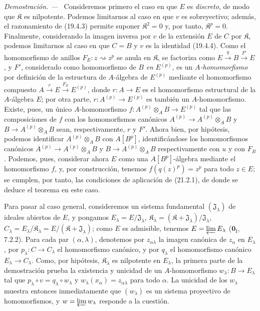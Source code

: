 \documentclass[10pt,oneside]{book}
\newcommand{\oldpage}[2][]{%
  \setcounter{footnote}{0}%
  \marginpar{\scriptsize\textbf{#1}~|~#2}\ignorespaces}
\newenvironment{proof}{%
  \par\medskip\noindent\textit{Demostración. ---\ }}{\par}
\begin{document}
\begin{proof}
Consideremos primero el caso en que $E$ es \emph{discreto}, de modo que $\mathfrak K$
es nilpotente. Podemos limitarnos al caso en que $v$ es sobreyectivo; además,
el razonamiento de (19.4.3) permite suponer $\mathfrak K^2=0$ y, por tanto,
$\mathfrak K^p=0$. Finalmente, considerando la imagen inversa por $v$ de la
extensión $E$ de $C$ por $\mathfrak K$, podemos limitarnos al caso en que $C=B$
y $v$ es la identidad (19.4.4). Como el homomorfismo de anillos
$F_E:z\rightsquigarrow z^p$ se anula en $\mathfrak K$, se factoriza como
$E\xrightarrow q B\xrightarrow{F'}E$, y $F'$, considerado como homomorfismo de
$B$ \emph{en} $E^{(p)}$, es un \emph{$A$-homomorfismo} por definición de la estructura de
$A$-álgebra de $E^{(p)}$ mediante el homomorfismo compuesto
$A\xrightarrow r E\xrightarrow{F_E}E^{(p)}$, donde $r:A\to E$ es el homomorfismo
estructural de la $A$-álgebra $E$; por otra parte,
$r:A^{(p)}\to E^{(p)}$ es también un $A$-homomorfismo. Existe, pues, un único
$A$-homomorfismo $f:A^{(p)}\otimes_A B\to E^{(p)}$ tal que las composiciones de
$f$ con los homomorfismos canónicos $A^{(p)}\to A^{(p)}\otimes_A B$ y
$B\to A^{(p)}\otimes_A B$ sean, respectivamente, $r$ y $F'$. Ahora bien, por
hipótesis, podemos identificar $A^{(p)}\otimes_A B$ con $A[B^p]$, identificándose
los homomorfismos canónicos $A^{(p)}\to A^{(p)}\otimes_A B$ y
$B\to A^{(p)}\otimes_A B$ respectivamente con $u$ y con $F_B$. Podemos, pues,
considerar ahora $E$ como una $A[B^p]$-álgebra mediante el homomorfismo $f$, y,
por construcción, tenemos $f(q(z)^p)=z^p$ para todo $z\in E$; se cumplen, por
tanto, las condiciones de aplicación de (21.2.1), de donde se deduce el
teorema en este caso.

Para pasar al caso general, consideremos un sistema fundamental
$(\mathfrak J_\lambda)$ de ideales abiertos de $E$, y pongamos
$E_\lambda=E/\mathfrak J_\lambda$,
$\mathfrak K_\lambda=(\mathfrak K+\mathfrak J_\lambda)/\mathfrak J_\lambda$,
$C_\lambda=E_\lambda/\mathfrak K_\lambda=E/(\mathfrak K+\mathfrak J_\lambda)$;
como $E$ es admisible, tenemos $E=\varprojlim E_\lambda$ ($\mathbf 0_{\mathrm I}$, 7.2.2).
Para cada par $(\alpha,\lambda)$, denotemos por $z_{\alpha\lambda}$ la imagen
canónica de $z_\alpha$ en $E_\lambda$, por $p_\lambda:C\to C_\lambda$ el
homomorfismo canónico,
\oldpage[0\textsubscript{IV-1}]{160}
y por $q_\lambda$ el homomorfismo canónico $E_\lambda\to C_\lambda$.
Como, por hipótesis, $\mathfrak K_\lambda$ es nilpotente en $E_\lambda$, la primera
parte de la demostración prueba la existencia y unicidad de un
$A$-homomorfismo $w_\lambda:B\to E_\lambda$ tal que
$p_\lambda\circ v=q_\lambda\circ w_\lambda$ y
$w_\lambda(x_\alpha)=z_{\alpha\lambda}$ para todo $\alpha$.
La unicidad de los $w_\lambda$ muestra entonces inmediatamente que $(w_\lambda)$
es un sistema proyectivo de homomorfismos, y $w=\varprojlim w_\lambda$ responde
a la cuestión.
\end{proof}
\end{document}
